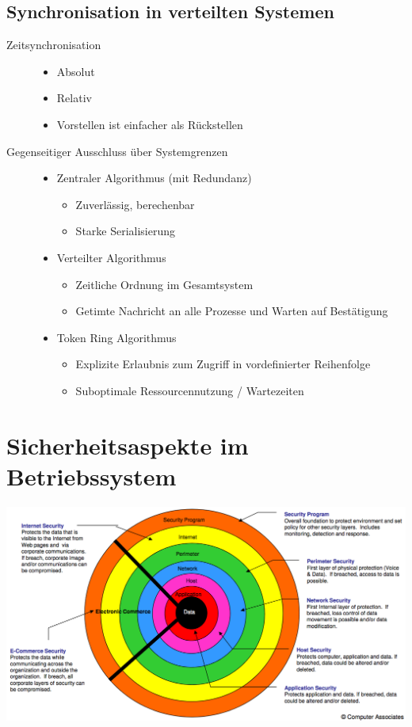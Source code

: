 \documentclass[a4paper, 10pt]{article}
\begin{document}
\subsection{Synchronisation in verteilten Systemen}
\begin{description}
	\item[Zeitsynchronisation] \hfill
		\begin{itemize}
			\item Absolut
			\item Relativ
			\item Vorstellen ist einfacher als R\"uckstellen
		\end{itemize}
	\item[Gegenseitiger Ausschluss \"uber Systemgrenzen] \hfill
		\begin{itemize}
			\item Zentraler Algorithmus (mit Redundanz)
				\begin{itemize}
					\item Zuverl\"assig, berechenbar
					\item Starke Serialisierung
				\end{itemize}
			\item Verteilter Algorithmus
				\begin{itemize}
					\item Zeitliche Ordnung im Gesamtsystem
					\item Getimte Nachricht an alle Prozesse und Warten auf Best\"atigung 
				\end{itemize}
			\item Token Ring Algorithmus
				\begin{itemize}
					\item Explizite Erlaubnis zum Zugriff in vordefinierter Reihenfolge
					\item Suboptimale Ressourcennutzung / Wartezeiten
				\end{itemize}
		\end{itemize}
\end{description}

\newpage
\section{Sicherheitsaspekte im Betriebssystem}
\includegraphics[scale=0.35]{onion_security.png}
\end{document}
